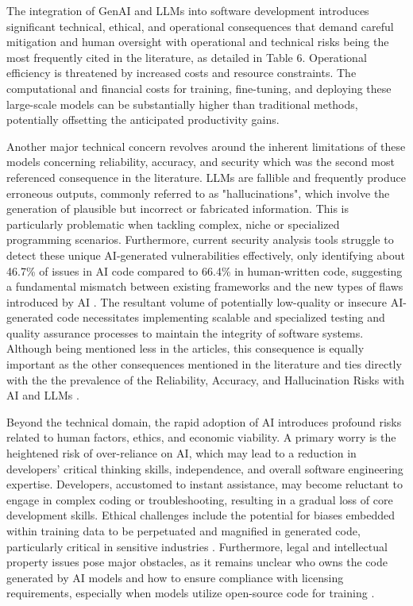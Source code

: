 The integration of GenAI and LLMs into software development introduces significant technical, ethical, and operational consequences that demand careful mitigation and human oversight with operational and technical risks being the most frequently cited in the literature, as detailed in Table 6. Operational efficiency is threatened by increased costs and resource constraints. The computational and financial costs for training, fine-tuning, and deploying these large-scale models can be substantially higher than traditional methods, potentially offsetting the anticipated productivity gains. 

Another major technical concern revolves around the inherent limitations of these models concerning reliability, accuracy, and security which was the second most referenced consequence in the literature. LLMs are fallible and frequently produce erroneous outputs, commonly referred to as "hallucinations", which involve the generation of plausible but incorrect or fabricated information. This is particularly problematic when tackling complex, niche or specialized programming scenarios. Furthermore, current security analysis tools struggle to detect these unique AI-generated vulnerabilities effectively, only identifying about 46.7\% of issues in AI code compared to 66.4\% in human-written code, suggesting a fundamental mismatch between existing frameworks and the new types of flaws introduced by AI \cite{Yoo:2025sa}. The resultant volume of potentially low-quality or insecure AI-generated code necessitates implementing scalable and specialized testing and quality assurance processes to maintain the integrity of software systems. Although being mentioned less in the articles, this consequence is equally important as the other consequences mentioned in the literature and ties directly with the the prevalence of the Reliability, Accuracy, and Hallucination Risks with AI and LLMs . 

Beyond the technical domain, the rapid adoption of AI introduces profound risks related to human factors, ethics, and economic viability. A primary worry is the heightened risk of over-reliance on AI, which may lead to a reduction in developers' critical thinking skills, independence, and overall software engineering expertise. Developers, accustomed to instant assistance, may become reluctant to engage in complex coding or troubleshooting, resulting in a gradual loss of core development skills. Ethical challenges include the potential for biases embedded within training data to be perpetuated and magnified in generated code, particularly critical in sensitive industries \cite{Haque:2025la}. Furthermore, legal and intellectual property issues pose major obstacles, as it remains unclear who owns the code generated by AI models and how to ensure compliance with licensing requirements, especially when models utilize open-source code for training \cite{Terragni:2025fa}. 

